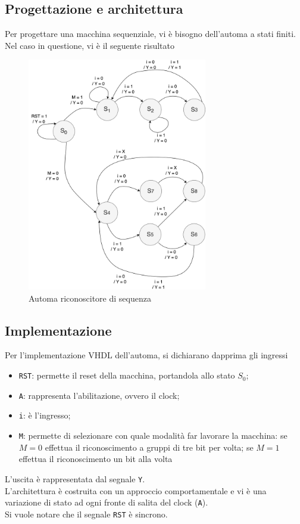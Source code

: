 \subsection{Progettazione e architettura}
Per progettare una macchina sequenziale, vi è bisogno dell'automa a stati finiti.\\
Nel caso in questione, vi è il seguente risultato
\begin{figure}[H]
	\centering
	\includegraphics[width=0.7\textwidth]{img/automa_riconoscitore}
	\caption{Automa riconoscitore di sequenza}
	\label{aut_ric_seq} 
\end{figure}

\subsection{Implementazione}
Per l'implementazione VHDL dell'automa, si dichiarano dapprima gli ingressi
\begin{itemize}
    \item \texttt{RST}: permette il reset della macchina, portandola allo stato $S_0$;
    \item \texttt{A}: rappresenta l'abilitazione, ovvero il clock;
    \item \texttt{i}: è l'ingresso;
    \item \texttt{M}: permette di selezionare con quale modalità far lavorare la macchina: se $M=0$ effettua il riconoscimento a gruppi di tre bit per volta; se $M=1$ effettua il riconoscimento un bit alla volta
\end{itemize}
L'uscita è rappresentata dal segnale \texttt{Y}.\\
L'architettura è costruita con un approccio comportamentale e vi è una variazione di stato ad ogni fronte di salita del clock (\texttt{A}).\\
Si vuole notare che il segnale \texttt{RST} è sincrono.


